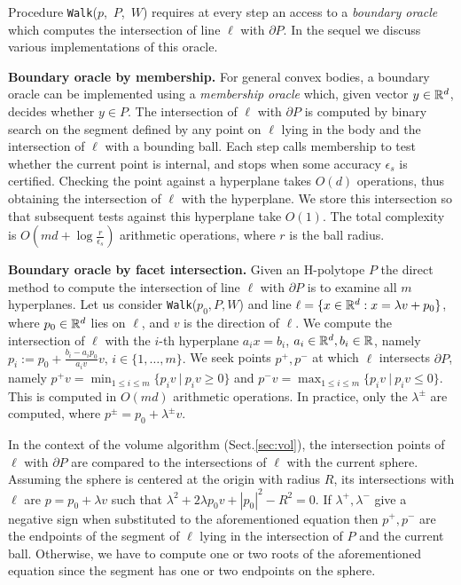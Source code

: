 \documentclass[11pt,a4paper]{article}
\def\Walk{{\tt Walk}}
\begin{document}
Procedure \Walk($p$,\ $P$,\ $W$) requires at every step an access to a {\it boundary oracle} which computes the intersection of line $\ell$ with $\partial P$.
In the sequel we discuss various implementations of this oracle. 

\vspace{.5em}
\textbf{Boundary oracle by membership.}
For general convex bodies, a boundary oracle can be implemented using a {\em membership oracle} which, given vector $y\in {\mathbb R}^d$, decides whether $y\in P$.
The intersection of $\ell$ with $\partial P$ is computed
by binary search on the segment defined by any point on $\ell$ lying in
the body and the intersection of $\ell$ with a bounding ball.
Each step calls membership to test whether the current point is internal,
and stops when some accuracy $\epsilon_s$ is certified.
Checking the point against a hyperplane takes $O(d)$ operations,
thus obtaining the intersection of $\ell$ with the hyperplane.
We store this intersection so that subsequent tests against
this hyperplane take $O(1)$.
The total complexity is $O(md+\log \frac{r}{\epsilon_s})$ arithmetic operations,
where $r$ is the ball radius. 

\textbf{Boundary oracle by facet intersection.}
Given an H-polytope $P$ the direct method to compute the intersection of line $\ell$ with $\partial P$ is to examine all $m$ hyperplanes.
Let us consider \Walk($p_0,P,W$) and
line $\ell = \{ x \in{\mathbb R}^d : x =\lambda v+ p_0 \}$,
where $p_0\in{\mathbb R}^d$ lies on $\ell$, and $v$ is the 
direction of $\ell$.
We compute the intersection of $\ell$ with
the $i$-th hyperplane ${a_ix}={b_i}$, $a_i\in{\mathbb R}^d,b_i\in{\mathbb R}$, namely
$
{p_i} := { p_0} + \frac{b_{i}-{a_i} { p_0}}{{a_i v}}{v},
\, i\in\{1,\dots,m\} .
$
We seek points $p^+,p^-$ at which $\ell$ intersects $\partial P$,
namely ${p^+v} = \min_{1\le i\le m}\{{p_iv} \ |\ {p_iv} \ge 0\}$  and 
${p^-v} = \max_{1\le i\le m}\{{p_iv} \ |\ {p_iv} \le 0\}.$
This is computed in $O(md)$ arithmetic operations.  
In practice, only the $\lambda^{\pm}$ are computed, where
${p^{\pm}}={p_0}+\lambda^{\pm} {v}$.

In the context of the volume algorithm (Sect.\ref{sec:vol}), 
the intersection points of $\ell$ with $\partial P$ are compared to the intersections of $\ell$ with the current sphere.
Assuming the sphere is centered at the origin with radius $R$,
its intersections with $\ell$
are ${p}={p_0}+\lambda {v}$ such that 
$\lambda^2 + 2\lambda {p_0}{v} + |{p_0}|^2 - R^2 = 0$. 
If $\lambda^+,\lambda^-$ give a negative sign when substituted to
the aforementioned equation 
then ${p^+,p^-}$ are the
endpoints of the segment of $\ell$ lying in the intersection of
$P$ and the current ball.
Otherwise, we have to compute one or two roots of
the aforementioned equation 
since the segment has one or two endpoints on the sphere.
\end{document}
